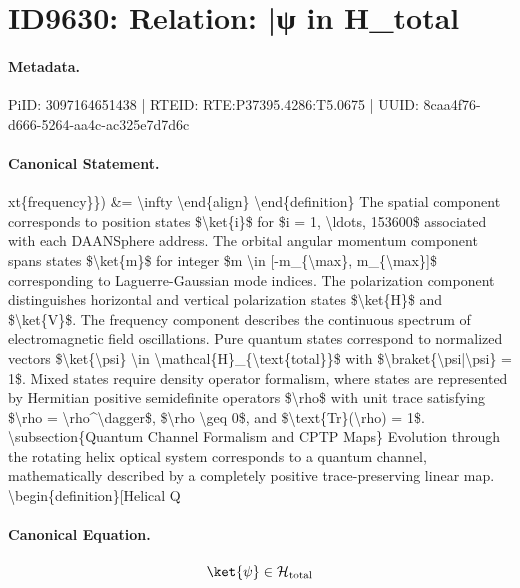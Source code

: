 \section*{ID9630: Relation: |ψ in H\_total}
\paragraph{Metadata.}
PiID: 3097164651438 | RTEID: RTE:P37395.4286:T5.0675 | UUID: 8caa4f76-d666-5264-aa4c-ac325e7d7d6c

\paragraph{Canonical Statement.}
xt\{frequency\}\}) \&= \textbackslash{}infty \textbackslash{}end\{align\} \textbackslash{}end\{definition\} The spatial component corresponds to position states \$\textbackslash{}ket\{i\}\$ for \$i = 1, \textbackslash{}ldots, 153600\$ associated with each DAANSphere address. The orbital angular momentum component spans states \$\textbackslash{}ket\{m\}\$ for integer \$m \textbackslash{}in [-m\_\{\textbackslash{}max\}, m\_\{\textbackslash{}max\}]\$ corresponding to Laguerre-Gaussian mode indices. The polarization component distinguishes horizontal and vertical polarization states \$\textbackslash{}ket\{H\}\$ and \$\textbackslash{}ket\{V\}\$. The frequency component describes the continuous spectrum of electromagnetic field oscillations. Pure quantum states correspond to normalized vectors \$\textbackslash{}ket\{\textbackslash{}psi\} \textbackslash{}in \textbackslash{}mathcal\{H\}\_\{\textbackslash{}text\{total\}\}\$ with \$\textbackslash{}braket\{\textbackslash{}psi|\textbackslash{}psi\} = 1\$. Mixed states require density operator formalism, where states are represented by Hermitian positive semidefinite operators \$\textbackslash{}rho\$ with unit trace satisfying \$\textbackslash{}rho = \textbackslash{}rho\textasciicircum{}\textbackslash{}dagger\$, \$\textbackslash{}rho \textbackslash{}geq 0\$, and \$\textbackslash{}text\{Tr\}(\textbackslash{}rho) = 1\$. \textbackslash{}subsection\{Quantum Channel Formalism and CPTP Maps\} Evolution through the rotating helix optical system corresponds to a quantum channel, mathematically described by a completely positive trace-preserving linear map. \textbackslash{}begin\{definition\}[Helical Q

\paragraph{Canonical Equation.}
\[
\ket{\psi} \in \mathcal{H}_{\text{total}}
\]

